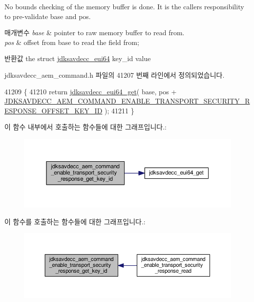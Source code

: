 No bounds checking of the memory buffer is done. It is the caller\textquotesingle{}s responsibility to pre-\/validate base and pos.


\begin{DoxyParams}{매개변수}
{\em base} & pointer to raw memory buffer to read from. \\
\hline
{\em pos} & offset from base to read the field from; \\
\hline
\end{DoxyParams}
\begin{DoxyReturn}{반환값}
the struct \hyperlink{structjdksavdecc__eui64}{jdksavdecc\+\_\+eui64} key\+\_\+id value 
\end{DoxyReturn}


jdksavdecc\+\_\+aem\+\_\+command.\+h 파일의 41207 번째 라인에서 정의되었습니다.


\begin{DoxyCode}
41209 \{
41210     \textcolor{keywordflow}{return} \hyperlink{group__eui64_ga2652311a25a6b91cddbed75c108c7031}{jdksavdecc\_eui64\_get}( base, pos + 
      \hyperlink{group__command__enable__transport__security__response_ga8ea74355019298fb5e345ab179a6b4c8}{JDKSAVDECC\_AEM\_COMMAND\_ENABLE\_TRANSPORT\_SECURITY\_RESPONSE\_OFFSET\_KEY\_ID}
       );
41211 \}
\end{DoxyCode}


이 함수 내부에서 호출하는 함수들에 대한 그래프입니다.\+:
\nopagebreak
\begin{figure}[H]
\begin{center}
\leavevmode
\includegraphics[width=350pt]{group__command__enable__transport__security__response_ga8778021262a7d369a63b076a21ed35dd_cgraph}
\end{center}
\end{figure}




이 함수를 호출하는 함수들에 대한 그래프입니다.\+:
\nopagebreak
\begin{figure}[H]
\begin{center}
\leavevmode
\includegraphics[width=350pt]{group__command__enable__transport__security__response_ga8778021262a7d369a63b076a21ed35dd_icgraph}
\end{center}
\end{figure}


